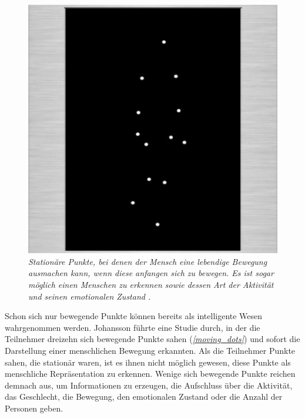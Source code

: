 \documentclass[a4paper,11pt]{article}%
\renewcommand{\\}{\vspace*{0.5\baselineskip} \newline}
\begin{document}
\begin{figure}[b!]
		\begin{footnotesize}
		\centering
			\includegraphics[scale= 0.5]{Abbildungen/moving_dots.JPG}
			\caption[Moving dots]{\textit{Stationäre Punkte, bei denen der Mensch eine lebendige Bewegung ausmachen kann, wenn diese anfangen sich zu bewegen. Es ist sogar möglich einen Menschen zu erkennen sowie dessen Art der Aktivität und seinen emotionalen Zustand \citep{biocca2002defining} \citep[S. 76-89]{johansson1975visual}.}}
			\label{moving_dots}
		\end{footnotesize}
	\end{figure}

Schon sich nur bewegende Punkte können bereits als intelligente Wesen wahrgenommen werden. Johansson \citep[S. 76-89]{johansson1975visual} führte eine Studie durch, in der die Teilnehmer dreizehn sich bewegende Punkte sahen (\textit{\autoref{moving_dots}}) und sofort die Darstellung einer menschlichen Bewegung erkannten. Als die Teilnehmer Punkte sahen, die stationär waren, ist es ihnen nicht möglich gewesen, diese Punkte als menschliche Repräsentation zu erkennen. Wenige sich bewegende Punkte reichen demnach aus, um Informationen zu erzeugen, die Aufschluss über die Aktivität, das Geschlecht, die Bewegung, den emotionalen Zustand oder die Anzahl der Personen geben.
\end{document}
